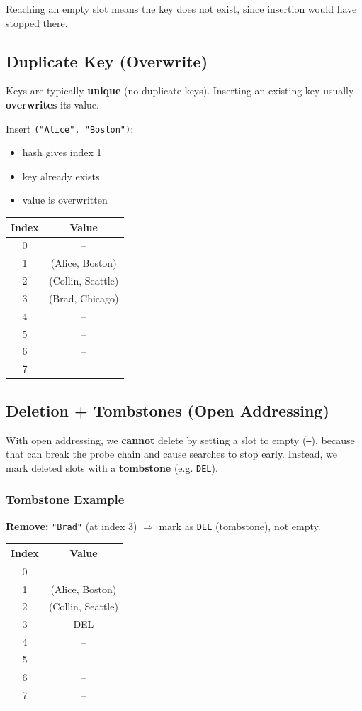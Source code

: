 Reaching an empty slot means the key does not exist, since insertion would have stopped there.

\subsection{Duplicate Key (Overwrite)}
Keys are typically \textbf{unique} (no duplicate keys). Inserting an existing key usually \textbf{overwrites} its value.

Insert \texttt{("Alice", "Boston")}:

\begin{itemize}
  \item hash gives index 1
  \item key already exists
  \item value is overwritten
\end{itemize}

\begin{center}
\begin{tabular}{c c}
\toprule
Index & Value \\
\midrule
0 & -- \\
1 & (Alice, Boston) \\
2 & (Collin, Seattle) \\
3 & (Brad, Chicago) \\
4 & -- \\
5 & -- \\
6 & -- \\
7 & -- \\
\bottomrule
\end{tabular}
\end{center}

\subsection{Deletion + Tombstones (Open Addressing)}
With open addressing, we \textbf{cannot} delete by setting a slot to empty (\texttt{--}), because that can break the probe chain and cause searches to stop early.  
Instead, we mark deleted slots with a \textbf{tombstone} (e.g. \texttt{DEL}).

\subsubsection*{Tombstone Example}
\textbf{Remove:} \texttt{"Brad"} (at index 3) $\Rightarrow$ mark as \texttt{DEL} (tombstone), not empty.

\begin{center}
\begin{tabular}{c c}
\toprule
Index & Value \\
\midrule
0 & -- \\
1 & (Alice, Boston) \\
2 & (Collin, Seattle) \\
3 & DEL \\
4 & -- \\
5 & -- \\
6 & -- \\
7 & -- \\
\bottomrule
\end{tabular}
\end{center}

